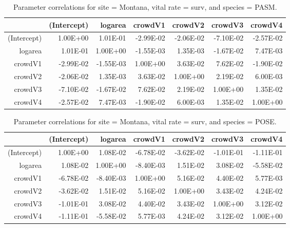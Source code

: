 \documentclass[12pt,]{article}
\begin{document}
\begin{table}[ht]
\centering
\caption{Parameter correlations for site = Montana, vital rate = surv, and species = PASM.} 
\begin{tabular}{rrrrrrr}
  \hline
 & (Intercept) & logarea & crowdV1 & crowdV2 & crowdV3 & crowdV4 \\ 
  \hline
(Intercept) & 1.00E+00 & 1.01E-01 & -2.99E-02 & -2.06E-02 & -7.10E-02 & -2.57E-02 \\ 
  logarea & 1.01E-01 & 1.00E+00 & -1.55E-03 & 1.35E-03 & -1.67E-02 & 7.47E-03 \\ 
  crowdV1 & -2.99E-02 & -1.55E-03 & 1.00E+00 & 3.63E-02 & 7.62E-02 & -1.90E-02 \\ 
  crowdV2 & -2.06E-02 & 1.35E-03 & 3.63E-02 & 1.00E+00 & 2.19E-02 & 6.00E-03 \\ 
  crowdV3 & -7.10E-02 & -1.67E-02 & 7.62E-02 & 2.19E-02 & 1.00E+00 & 1.35E-02 \\ 
  crowdV4 & -2.57E-02 & 7.47E-03 & -1.90E-02 & 6.00E-03 & 1.35E-02 & 1.00E+00 \\ 
   \hline
\end{tabular}
\end{table}

\newpage{}

\begin{table}[ht]
\centering
\caption{Parameter correlations for site = Montana, vital rate = surv, and species = POSE.} 
\begin{tabular}{rrrrrrr}
  \hline
 & (Intercept) & logarea & crowdV1 & crowdV2 & crowdV3 & crowdV4 \\ 
  \hline
(Intercept) & 1.00E+00 & 1.08E-02 & -6.78E-02 & -3.62E-02 & -1.01E-01 & -1.11E-01 \\ 
  logarea & 1.08E-02 & 1.00E+00 & -8.40E-03 & 1.51E-02 & 3.08E-02 & -5.58E-02 \\ 
  crowdV1 & -6.78E-02 & -8.40E-03 & 1.00E+00 & 5.16E-02 & 4.40E-02 & 5.77E-03 \\ 
  crowdV2 & -3.62E-02 & 1.51E-02 & 5.16E-02 & 1.00E+00 & 3.43E-02 & 4.24E-02 \\ 
  crowdV3 & -1.01E-01 & 3.08E-02 & 4.40E-02 & 3.43E-02 & 1.00E+00 & 3.12E-02 \\ 
  crowdV4 & -1.11E-01 & -5.58E-02 & 5.77E-03 & 4.24E-02 & 3.12E-02 & 1.00E+00 \\ 
   \hline
\end{tabular}
\end{table}
\end{document}
